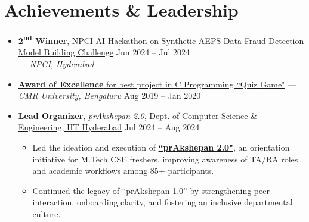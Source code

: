 \documentclass[a4paper,10pt]{article}
\begin{document}
\section*{Achievements \& Leadership}
\vspace{-6pt}
\begin{itemize}[leftmargin=*, itemsep=1.7mm]
    \item \href{https://media.licdn.com/dms/image/v2/D562DAQEzZtjEzphXrQ/profile-treasury-image-shrink_800_800/B56Zg9EgQnHcAc-/0/1753371248386?e=1753977600&v=beta&t=tc0TChhqmhRshqfp_yhZjOxoO-DvPNxqJRoR8JvjGu0}{\textbf{2\textsuperscript{nd} Winner}, NPCI AI Hackathon on Synthetic AEPS Data Fraud Detection Model Building Challenge} \hfill Jun 2024 -- Jul 2024\\
    --- \textit{NPCI, Hyderabad}  \vspace{-8pt}
    \item \href{https://media.licdn.com/dms/image/v2/C562DAQFOPwLOQ1bw6A/profile-treasury-document-images_1920/profile-treasury-document-images_1920/1/1676624622267?e=1754524800&v=beta&t=dvaRiypja5mWNskpH8gLm2GG8JDrqx8DkgFoEV1oamo}{\textbf{Award of Excellence} for best project in C Programming ``Quiz Game"} --- \textit{CMR University, Bengaluru} \hfill Aug 2019 -- Jan 2020 \\ \vspace{-18pt} 
    \item \href{https://www.linkedin.com/posts/agarwalkritik_prakshepan-departmentofcse-cse-activity-7225824357875335169-4Ue1}{\textbf{Lead Organizer}, \textit{prAkshepan 2.0}, Dept. of Computer Science \& Engineering, IIT Hyderabad} \hfill Jul 2024 -- Aug 2024 \\
\vspace{-15pt}
\begin{itemize}[leftmargin=*, itemsep=1.5mm, rightmargin=2ex]
     \item Led the ideation and execution of \href{https://www.linkedin.com/posts/agarwalkritik_prakshepan-departmentofcse-cse-activity-7225824357875335169-4Ue1}{\textbf{``prAkshepan 2.0"}}, an orientation initiative for M.Tech CSE freshers, improving awareness of TA/RA roles and academic workflows among 85+ participants. \vspace{-4pt}
    \item Continued the legacy of “prAkshepan 1.0” by strengthening peer interaction, onboarding clarity, and fostering an inclusive departmental culture.
\end{itemize}
\end{itemize}
\vspace{-14pt}
\end{document}
